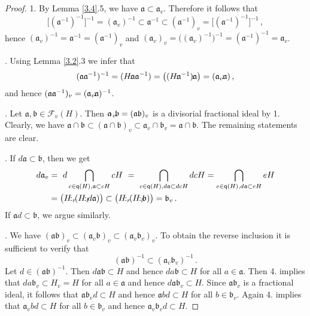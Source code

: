 \documentclass[a4paper]{amsart}
\theoremstyle{definition}
\numberwithin{equation}{section}
\begin{document}
\begin{proof}
1. By Lemma \ref{3.4}.5, we have $\mathfrak a \subset   \mathfrak
a_v$. Therefore it follows that
\[
\big[ ( \mathfrak a^{-1})^{-1} \big]^{-1} = (\mathfrak a_v)^{-1}
\subset \mathfrak a^{-1} \subset (\mathfrak a^{-1})_v = \big[ (
\mathfrak a^{-1})^{-1} \big]^{-1} \,,
\]
hence $(\mathfrak a_v)^{-1} = \mathfrak a^{-1} = (\mathfrak
a^{-1})_v$ and $(\mathfrak a_v)_v = \big( (\mathfrak a_v)^{-1}
\big)^{-1} = (\mathfrak a^{-1})^{-1} = \mathfrak a_v$.

.
Using Lemma \ref{3.2}.3 we infer that
\[
(\mathfrak a \mathfrak a^{-1})^{-1} = (H {\negthinspace : \negthinspace} \mathfrak a \mathfrak
a^{-1}) = \big( ( H {\negthinspace : \negthinspace} \mathfrak a^{-1}) {\negthinspace : \negthinspace} \mathfrak a \big) = (
\mathfrak a_v {\negthinspace : \negthinspace} \mathfrak a) \,,
\]
and hence $(\mathfrak a \mathfrak a^{-1})_v = ( \mathfrak a_v {\negthinspace : \negthinspace}
\mathfrak a)^{-1}$.

. Let $\mathfrak a, \mathfrak b \in \mathcal F_v (H)$. Then
$\mathfrak a {\negthinspace \cdot_v \negthinspace} \mathfrak b = ( \mathfrak a \mathfrak b)_v$ is a
divisorial fractional ideal by 1. Clearly, we have $\mathfrak a \cap
\mathfrak b \subset (\mathfrak a \cap \mathfrak b)_v \subset
\mathfrak a_v \cap \mathfrak b_v = \mathfrak a \cap \mathfrak b$.
The remaining statements are clear.

. If $d \mathfrak a \subset \mathfrak b$, then we get
\[
\begin{aligned}
d \mathfrak a_v & = \ d  \bigcap_{c \in \mathsf q (H), \mathfrak a
\subset cH} c H \ = \ \bigcap_{c \in \mathsf q (H), d \mathfrak a
\subset dcH} d c H  = \bigcap_{e \in \mathsf q (H), d \mathfrak a
\subset e H} e  H \\
 & = \big( H {\negthinspace :_r \negthinspace} (H {\negthinspace :_l \negthinspace} d \mathfrak a) \big)
\subset \big( H {\negthinspace :_r \negthinspace} (H {\negthinspace :_l \negthinspace} \mathfrak b) \big) = \mathfrak b_v \,.
\end{aligned}
\]
If $\mathfrak a d \subset \mathfrak b$, we argue similarly.

. We have $(\mathfrak a \mathfrak b)_v \subset (\mathfrak a_v
\mathfrak b)_v \subset (\mathfrak a_v \mathfrak b_v)_v$. To obtain
the reverse inclusion it is sufficient to verify that
\[
(\mathfrak a \mathfrak b)^{-1} \subset (\mathfrak a_v \mathfrak
b_v)^{-1} \,.
\]
Let $d \in (\mathfrak a \mathfrak b)^{-1}$. Then $d \mathfrak a
\mathfrak b \subset H$ and hence $d a \mathfrak b \subset H$ for all
$a \in \mathfrak a$. Then 4. implies that $d a \mathfrak b_v \subset
H_v = H$ for all $a \in \mathfrak a$ and hence $d \mathfrak a
\mathfrak b_v \subset H$. Since $\mathfrak a \mathfrak b_v$ is a
fractional ideal, it follows that $\mathfrak a \mathfrak b_v d
\subset H$ and hence $\mathfrak a b d \subset H$ for all $b \in
\mathfrak b_v$. Again 4. implies that $\mathfrak a_v b d \subset H$
for all $b \in \mathfrak b_v$ and hence $\mathfrak a_v \mathfrak b_v
d \subset H$.


\end{proof}
\end{document}
